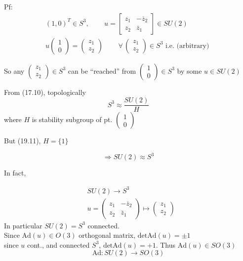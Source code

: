   Pf:
\[
\begin{gathered}
  (1,0)^T \in S^3 , \quad \quad \, u = \left[ \begin{matrix} z_1 & - \overline{z}_2 \\ z_2 & \overline{z}_1 \end{matrix} \right] \in SU(2) \\ 
 u\left( \begin{matrix} 1 \\ 0 \end{matrix} \right) = \left( \begin{matrix} z_1 \\ z_2 \end{matrix} \right) \quad \quad \, \forall \, \left( \begin{matrix} z_1 \\ z_2 \end{matrix} \right) \in S^3 \text{ i.e. (arbitrary) }
\end{gathered}
\]

So any $\left( \begin{matrix} z_1 \\ z_2 \end{matrix} \right) \in S^3$ can be ``reached'' from $\left( \begin{matrix} 1 \\ 0 \end{matrix} \right) \in S^3$ by some $u\in SU(2)$


From (17.10), topologically
\[
S^3 \approx \frac{SU(2)}{H}
\]
where $H$ is stability subgroup of pt. $\left( \begin{matrix} 1 \\ 0 \end{matrix} \right)$

But (19.11), $H = \lbrace 1 \rbrace$

\[
\Longrightarrow SU(2) \approx S^3
\]

In fact, 

\[
\begin{aligned}
  & SU(2) \to S^3 \\ 
  & u = \left( \begin{matrix} z_1 & - \overline{z}_2 \\ z_2 & \overline{z}_1 \end{matrix} \right) \mapsto \left( \begin{matrix} z_1 \\ z_2 \end{matrix} \right)
\end{aligned}
\]
In particular $SU(2) =S^3$ connected. \\
Since $\text{Ad}(u) \in O(3)$ orthogonal matrix, $\text{det}\text{Ad}(u) = \pm 1$ \\
since $u$ cont., and connected $S^3$, $\text{det}{ \text{Ad}(u)}= + 1$.  Thus $\text{Ad}{(u)} \in SO(3)$
\[
\text{Ad}:SU(2) \to SO(3)
\]

